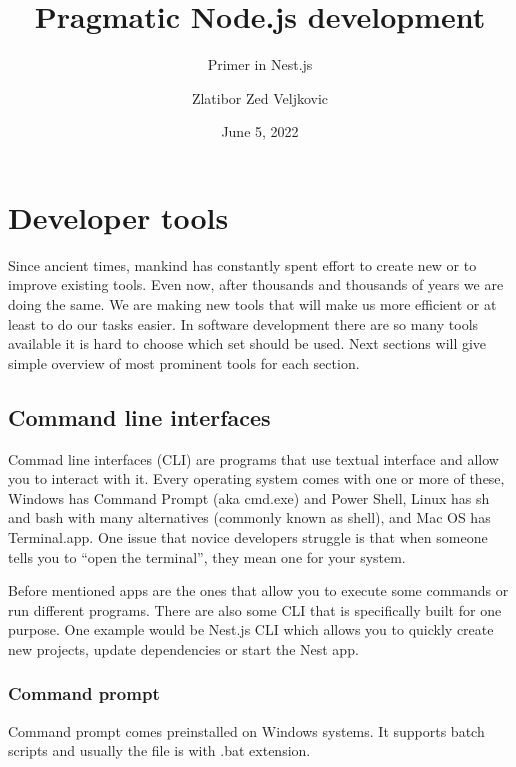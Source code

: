 \documentclass[lang=en,color=green]{elegantbook}
\title{Pragmatic Node.js development}
\subtitle{Primer in Nest.js}
\author{Zlatibor Zed Veljkovic}
\date{June 5, 2022}
\begin{document}
\maketitle
\frontmatter

\tableofcontents

\mainmatter

\chapter{Developer tools}

Since ancient times, mankind has constantly spent effort to create new or to improve existing tools.
Even now, after thousands and thousands of years we are doing the same.
We are making new tools that will make us more efficient or at least to do our tasks easier.
In software development there are so many tools available it is hard to choose which set should be used. Next sections will give simple overview of most prominent tools for each section.


\section{Command line interfaces}
Commad line interfaces (CLI) are programs that use textual interface and allow you to interact with it.
Every operating system comes with one or more of these, Windows has Command Prompt (aka cmd.exe) and Power Shell,
Linux has sh and bash with many alternatives (commonly known as shell), and Mac OS has Terminal.app.
One issue that novice developers struggle is that when someone tells you to “open the terminal”,
they mean one for your system.

Before mentioned apps are the ones that allow you to execute some commands or run different programs.
There are also some CLI that is specifically built for one purpose.
One example would be Nest.js CLI which allows you to quickly create new projects,
update dependencies or start the Nest app.

\subsection{Command prompt}
Command prompt comes preinstalled on Windows systems.
It supports batch scripts and usually the file is with .bat extension.
\end{document}
